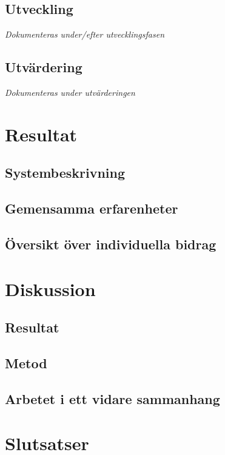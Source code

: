 \documentclass[a4paper,10pt]{article}
\begin{document}
\subsection{Utveckling}
\textit{Dokumenteras under/efter utvecklingsfasen}

\subsection{Utvärdering}
\textit{Dokumenteras under utvärderingen}

\section{Resultat}

\subsection{Systembeskrivning}

\subsection{Gemensamma erfarenheter}

\subsection{Översikt över individuella bidrag}

\section{Diskussion}

\subsection{Resultat}

\subsection{Metod}

\subsection{Arbetet i ett vidare sammanhang}

\section{Slutsatser}
\end{document}

